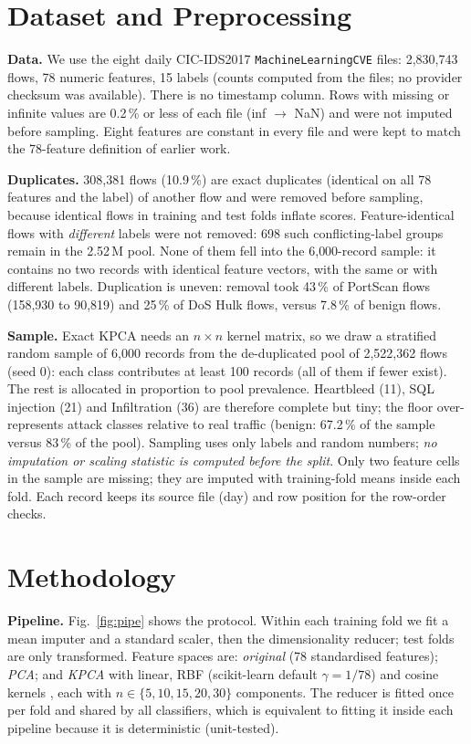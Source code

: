 \documentclass[runningheads]{llncs}
\begin{document}
\section{Dataset and Preprocessing}\label{sec:data}
\textbf{Data.} We use the eight daily CIC-IDS2017 \texttt{MachineLearningCVE} files: 2{,}830{,}743 flows, 78 numeric features, 15 labels (counts computed from the files; no provider checksum was available). There is no timestamp column. Rows with missing or infinite values are 0.2\,\% or less of each file (inf $\to$ NaN) and were not imputed before sampling. Eight features are constant in every file and were kept to match the 78-feature definition of earlier work.

\textbf{Duplicates.} 308{,}381 flows (10.9\,\%) are exact duplicates (identical on all 78 features and the label) of another flow and were removed before sampling, because identical flows in training and test folds inflate scores. Feature-identical flows with \emph{different} labels were not removed: 698 such conflicting-label groups remain in the 2.52\,M pool. None of them fell into the 6{,}000-record sample: it contains no two records with identical feature vectors, with the same or with different labels. Duplication is uneven: removal took 43\,\% of PortScan flows (158{,}930 to 90{,}819) and 25\,\% of DoS Hulk flows, versus 7.8\,\% of benign flows.

\textbf{Sample.} Exact KPCA needs an $n\times n$ kernel matrix, so we draw a stratified random sample of 6{,}000 records from the de-duplicated pool of 2{,}522{,}362 flows (seed 0): each class contributes at least 100 records (all of them if fewer exist). The rest is allocated in proportion to pool prevalence. Heartbleed (11), SQL injection (21) and Infiltration (36) are therefore complete but tiny; the floor over-represents attack classes relative to real traffic (benign: 67.2\,\% of the sample versus 83\,\% of the pool). Sampling uses only labels and random numbers; \emph{no imputation or scaling statistic is computed before the split}. Only two feature cells in the sample are missing; they are imputed with training-fold means inside each fold. Each record keeps its source file (day) and row position for the row-order checks.



\section{Methodology}\label{sec:method}
\textbf{Pipeline.} Fig.~\ref{fig:pipe} shows the protocol. Within each training fold we fit a mean imputer and a standard scaler, then the dimensionality reducer; test folds are only transformed. Feature spaces are: \emph{original} (78 standardised features); \emph{PCA}; and \emph{KPCA} with linear, RBF (scikit-learn default $\gamma=1/78$) and cosine kernels \cite{scholkopf1998}, each with $n\in\{5,10,15,20,30\}$ components. The reducer is fitted once per fold and shared by all classifiers, which is equivalent to fitting it inside each pipeline because it is deterministic (unit-tested).
\end{document}
